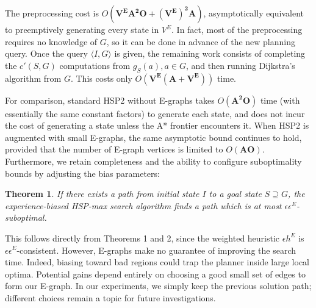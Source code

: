 \documentclass[letterpaper]{article}
\newtheorem{thm}{Theorem}
\begin{document}
The preprocessing cost is $O(\mathbf{V^EA^2O + (V^E)^2A})$, asymptotically equivalent to preemptively generating every state in $V^E$.
In fact, most of the preprocessing requires no knowledge of $G$, so it can be done in advance of the new planning query. Once the query $\langle I,G\rangle$ is given, the remaining work consists of completing the $c'(S,G)$ computations from $g_S(a),a\in G$, and then running Dijkstra's algorithm from $G$. This costs only $O(\mathbf{V^E(A + V^E)})$ time.

For comparison, standard HSP2 without E-graphs takes $O(\mathbf{A^2O})$ time (with essentially the same constant factors) to generate each state, and does not incur the cost of generating a state unless the A* frontier encounters it.
When HSP2 is augmented with small E-graphs, the same asymptotic bound continues to hold, provided that the number of E-graph vertices is limited to $O(\mathbf{AO})$. Furthermore, we retain completeness and the ability to configure suboptimality bounds by adjusting the bias parameters:

\begin{thm}
If there exists a path from initial state $I$ to a goal state $S\supseteq G$, the experience-biased HSP-max search algorithm finds a path which is at most $\epsilon\epsilon^E$-suboptimal.
\end{thm}

This follows directly from Theorems 1 and 2, since the weighted heuristic $\epsilon h^E$ is $\epsilon \epsilon^E$-consistent.
However, E-graphs make no guarantee of improving the search time. Indeed, biasing toward bad regions could trap the planner inside large local optima.
Potential gains depend entirely on choosing a good small set of edges to form our E-graph.
In our experiments, we simply keep the previous solution path; different choices remain a topic for future investigations.

\end{document}
